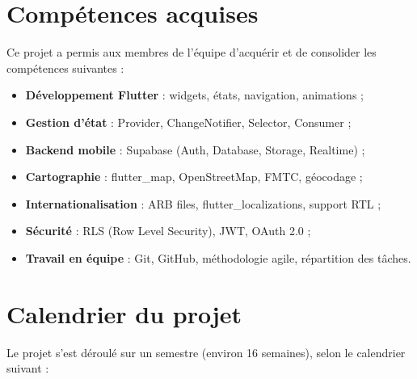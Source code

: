 \documentclass[12pt,a4paper]{report}
\begin{document}
\section{Compétences acquises}

Ce projet a permis aux membres de l'équipe d'acquérir et de consolider les compétences suivantes :

\begin{itemize}
    \item \textbf{Développement Flutter} : widgets, états, navigation, animations ;
    \item \textbf{Gestion d'état} : Provider, ChangeNotifier, Selector, Consumer ;
    \item \textbf{Backend mobile} : Supabase (Auth, Database, Storage, Realtime) ;
    \item \textbf{Cartographie} : flutter\_map, OpenStreetMap, FMTC, géocodage ;
    \item \textbf{Internationalisation} : ARB files, flutter\_localizations, support RTL ;
    \item \textbf{Sécurité} : RLS (Row Level Security), JWT, OAuth 2.0 ;
    \item \textbf{Travail en équipe} : Git, GitHub, méthodologie agile, répartition des tâches.
\end{itemize}

\section{Calendrier du projet}

Le projet s'est déroulé sur un semestre (environ 16 semaines), selon le calendrier suivant :
\end{document}
